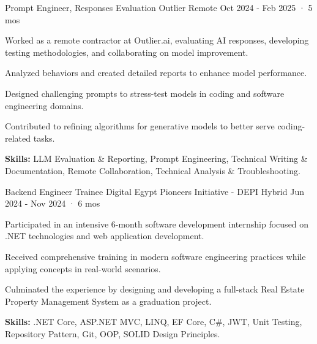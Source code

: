 

\begin{cventries}
  \cventry
    {Prompt Engineer, Responses Evaluation} %
    {Outlier} %
    {Remote} %
    {Oct 2024 - Feb 2025 · 5 mos} %
    {
      \begin{cvitems} %
        \item {Worked as a remote contractor at Outlier.ai, evaluating AI responses, developing testing methodologies, and collaborating on model improvement.}
        \item {Analyzed behaviors and created detailed reports to enhance model performance.}
        \item {Designed challenging prompts to stress-test models in coding and software engineering domains.}
        \item {Contributed to refining algorithms for generative models to better serve coding-related tasks.}
        \item {\textbf{Skills:} LLM Evaluation \& Reporting, Prompt Engineering, Technical Writing \& Documentation, Remote Collaboration, Technical Analysis \& Troubleshooting.}
      \end{cvitems}
    }
  \cventry
    {Backend Engineer Trainee} %
    {Digital Egypt Pioneers Initiative - DEPI} %
    {Hybrid} %
    {Jun 2024 - Nov 2024 · 6 mos} %
    {
      \begin{cvitems} %
        \item {Participated in an intensive 6-month software development internship focused on .NET technologies and web application development.}
        \item {Received comprehensive training in modern software engineering practices while applying concepts in real-world scenarios.}
        \item {Culminated the experience by designing and developing a full-stack Real Estate Property Management System as a graduation project.}
        \item {\textbf{Skills:} .NET Core, ASP.NET MVC, LINQ, EF Core, C\#, JWT, Unit Testing, Repository Pattern, Git, OOP, SOLID Design Principles.}
      \end{cvitems}
    }
    

\end{cventries}
